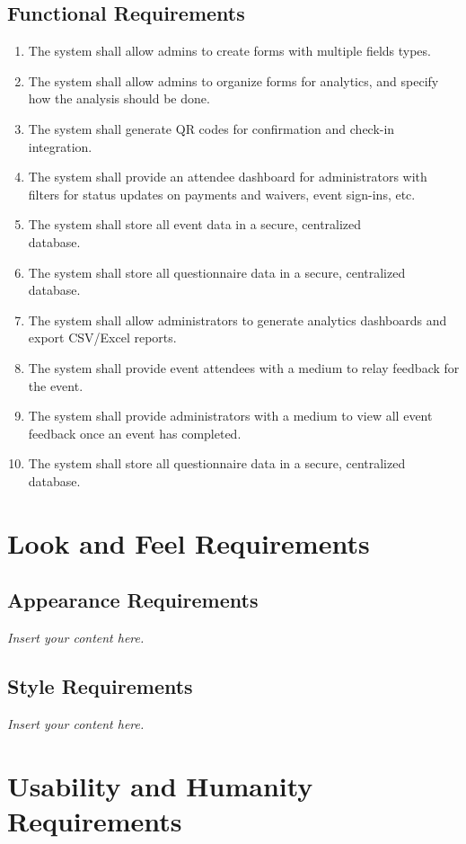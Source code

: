 \documentclass[12pt]{article}
\newcommand{\lips}{\textit{Insert your content here.}}
\begin{document}
\subsection{Functional Requirements}
\begin{enumerate}[align=left,
  leftmargin=*,
  labelsep=1em,
  labelwidth=4em,
  itemindent=0em,
  label=\bfseries FR-\arabic*:]
  \item The system shall allow admins to create forms with multiple fields types.
  \item The system shall allow admins to organize forms for analytics, and specify how
    the analysis should be done.
  \item The system shall generate QR codes for confirmation and check-in integration.
  \item The system shall provide an attendee dashboard for administrators with filters
    for status updates on payments and waivers, event sign-ins, etc.
  \item The system shall store all event data in a secure, centralized\\database.
  \item The system shall store all questionnaire data in a secure, centralized database.
  \item The system shall allow administrators to generate analytics dashboards and export
    CSV/Excel reports.
  \item The system shall provide event attendees with a medium to relay feedback for the
    event.
  \item The system shall provide administrators with a medium to view all event feedback
    once an event has completed.
  \item{The system shall store all questionnaire data in a secure, centralized database.}
\end{enumerate}

\section{Look and Feel Requirements}
\subsection{Appearance Requirements}
\lips
\subsection{Style Requirements}
\lips

\section{Usability and Humanity Requirements}
\end{document}
